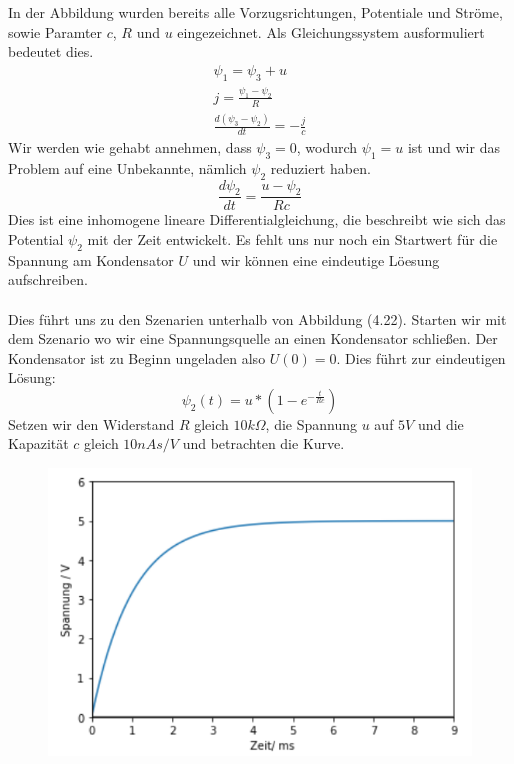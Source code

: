 \documentclass[11pt,a4paper,leqno]{report}
\numberwithin{equation}{chapter}
\begin{document}
 \noindent
 In der Abbildung wurden bereits alle Vorzugsrichtungen, Potentiale und Str\"ome, sowie Paramter $c$, $R$ und $u$ eingezeichnet. Als Gleichungssystem ausformuliert bedeutet dies.
 \begin{align} 
 	\psi_1 = \psi_3 + u\\
	j = \frac{\psi_1 - \psi_2}{R}\\
	\frac{d(\psi_3 - \psi_2)}{dt} = - \frac{j}{c}
 \end{align}
Wir werden wie gehabt annehmen, dass $\psi_3 = 0$, wodurch $\psi_1 = u$ ist und wir das Problem auf eine Unbekannte, n\"amlich $\psi_2$ reduziert haben.
\begin{equation}
	\frac{d\psi_2}{dt} = \frac{u - \psi_2}{R c}
\end{equation}
Dies ist eine inhomogene lineare Differentialgleichung, die beschreibt wie sich das Potential $\psi_2$ mit der Zeit entwickelt. Es fehlt uns nur noch ein Startwert f\"ur die Spannung am Kondensator $U$ und wir k\"onnen eine eindeutige L\"oesung aufschreiben. \\
\\
Dies f\"uhrt uns zu den Szenarien unterhalb von Abbildung (4.22). Starten wir mit dem Szenario wo wir eine Spannungsquelle an einen Kondensator schlie\ss{}en. Der Kondensator ist zu Beginn ungeladen also $U(0) = 0$.
Dies f\"uhrt zur eindeutigen L\"osung:
\begin{equation}
	\psi_2(t) = u * (1 - e^{-\frac{t}{Rc}})
\end{equation}
Setzen wir den Widerstand $R$ gleich $10k\Omega$, die Spannung $u$ auf $5V$ und die Kapazit\"at $c$ gleich $10nAs/V$ und betrachten die Kurve.
   \begin{figure}[H]
	\begin{center}
		\includegraphics[scale=0.5]{Ladung.png}
	\end{center}
\end{figure}
\end{document}
